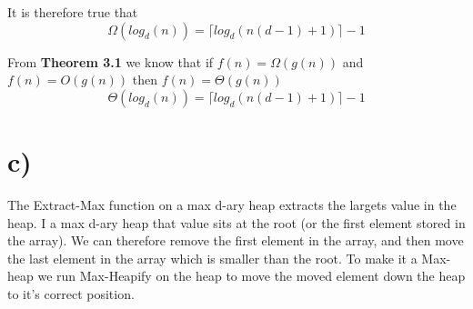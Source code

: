 \documentclass{article}
\begin{document}
It is therefore true that
$$\Omega(log_d{(n)}) = \lceil log_d{(n(d-1)+1)} \rceil - 1$$

From \textbf{Theorem 3.1} we know that if $f(n) = \Omega{(g(n))}$ and $f(n) = O{(g(n))}$ then $f(n) = \Theta{(g(n))}$
$$\Theta(log_d{(n)}) = \lceil log_d{(n(d-1)+1)} \rceil - 1$$

\section*{c)}
The Extract-Max function on a max d-ary heap extracts the largets value in the heap. I a max d-ary heap that value sits at the root (or the first element stored in the array).
We can therefore remove the first element in the array, and then move the last element in the array which is smaller than the root.
To make it a Max-heap we run Max-Heapify on the heap to move the moved element down the heap to it's correct position.

\begin{center}
	\begin{minipage}{12cm}
		\begin{algorithmic}

			\EndIf

			\EndProcedure

			\\
			\\


			\EndIf
			\EndFor

			\EndIf

			\EndProcedure

			\\
			\\
			\EndProcedure
		\end{algorithmic}
	\end{minipage}
\end{center}
\end{document}
